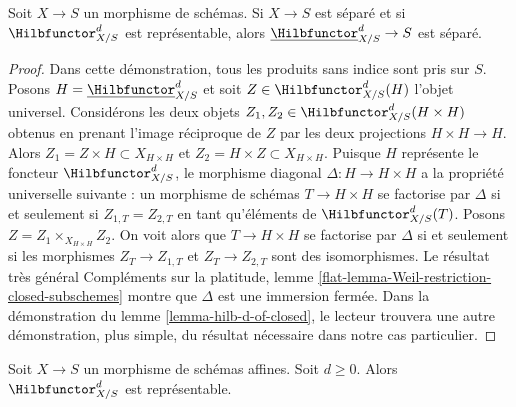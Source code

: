 \begin{lemma}
\label{lemma-hilb-d-separated}
Soit $X \to S$ un morphisme de schémas. Si $X \to S$ est séparé et si
$\Hilbfunctor^d_{X/S}$ est représentable,
alors $\underline{\Hilbfunctor}^d_{X/S} \to S$ est séparé.
\end{lemma}

\begin{proof}
Dans cette démonstration, tous les produits sans indice sont pris sur $S$.
Posons $H = \underline{\Hilbfunctor}^d_{X/S}$ et soit
$Z \in \Hilbfunctor^d_{X/S}(H)$ l'objet universel.
Considérons les deux objets $Z_1, Z_2 \in \Hilbfunctor^d_{X/S}(H \times H)$
obtenus en prenant l'image réciproque de $Z$ par les deux projections $H \times H \to H$.
Alors $Z_1 = Z \times H \subset X_{H \times H}$ et $Z_2 = H \times Z
\subset X_{H \times H}$. Puisque $H$ représente le foncteur
$\Hilbfunctor^d_{X/S}$, le morphisme diagonal $\Delta : H \to H \times H$
a la propriété universelle suivante : un morphisme de schémas
$T \to H \times H$ se factorise par $\Delta$ si et seulement si
$Z_{1, T} = Z_{2, T}$ en tant qu'éléments de $\Hilbfunctor^d_{X/S}(T)$.
Posons $Z = Z_1 \times_{X_{H \times H}} Z_2$. On voit alors que
$T \to H \times H$ se factorise par $\Delta$ si et seulement si
les morphismes $Z_T \to Z_{1, T}$ et $Z_T \to Z_{2, T}$ sont des
isomorphismes. Le résultat très général
Compléments sur la platitude, lemme \ref{flat-lemma-Weil-restriction-closed-subschemes}
montre que $\Delta$ est une immersion fermée. Dans la démonstration du
lemme \ref{lemma-hilb-d-of-closed},
le lecteur trouvera une autre démonstration, plus simple, du résultat nécessaire
dans notre cas particulier.
\end{proof}

\begin{lemma}
\label{lemma-hilb-d-An}
Soit $X \to S$ un morphisme de schémas affines. Soit $d \geq 0$. Alors
$\Hilbfunctor^d_{X/S}$ est représentable.
\end{lemma}

